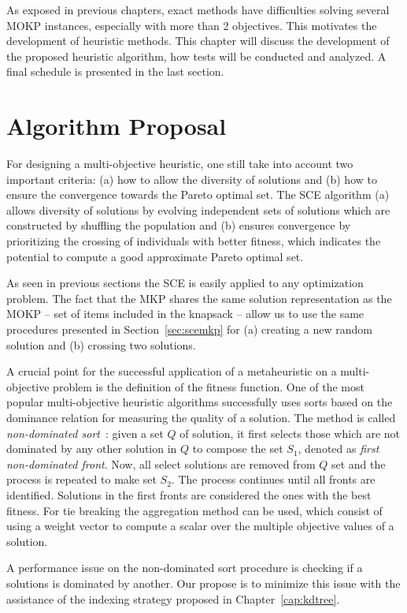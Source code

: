 As exposed in previous chapters,
exact methods have difficulties solving several MOKP instances,
especially with more than 2 objectives.
This motivates the development of heuristic methods.
This chapter will discuss the development of
the proposed heuristic algorithm, how tests will be
conducted and analyzed.
A final schedule is presented in the last section.

\section{Algorithm Proposal}
For designing a multi-objective heuristic, one still take into account
two important criteria: (a) how to allow the diversity of solutions
and (b) how to ensure the convergence towards the Pareto optimal set.
The SCE algorithm (a) allows diversity of solutions by evolving independent
sets of solutions which are constructed by shuffling the 
population and (b) ensures convergence by prioritizing
the crossing of individuals with better fitness, which
indicates the potential to compute a good approximate Pareto optimal set.

As seen in previous sections
the SCE is easily applied to any optimization problem.
The fact that the MKP shares the same solution representation
as the MOKP
-- set of items included in the knapsack --
allow us to use the same procedures
presented in Section~\ref{sec:scemkp}
for (a) creating a new random solution
and (b) crossing two solutions.

A crucial point for the successful application of a metaheuristic
on a multi-objective problem is the definition of the fitness function.
One of the most popular multi-objective heuristic algorithms successfully uses sorts
based on the dominance relation for measuring the quality of a solution.
The method is called \emph{non-dominated sort}~\cite{deb2002fast}:
given a set $Q$ of solution, it first selects those which are not dominated
by any other solution in $Q$ to compose the set $S_1$, denoted as
\emph{first non-dominated front}.
Now, all select solutions are removed from $Q$ set and the process
is repeated to make set $S_2$.
The process continues until all fronts are identified.
Solutions in the first fronts are considered the ones with the best fitness.
For tie breaking the aggregation method can be used, which consist of using
a weight vector to compute a scalar over the multiple objective values
of a solution.

A performance issue on the non-dominated sort procedure is
checking if a solutions is dominated by another.
Our propose is to minimize this issue with the assistance
of the indexing strategy proposed in Chapter~\ref{cap:kdtree}.


